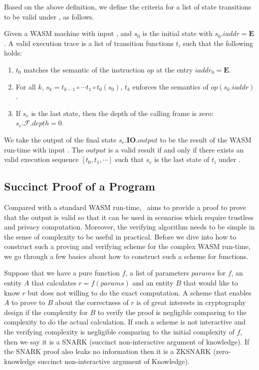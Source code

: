 \smallskip Based on the above definition, we define the criteria for a list of state transitions to be valid under \initstate, as follows.

\begin{definition}
\label{def:valid-trace}
Given a WASM machine with input \initstate, and $s_0$ is the initial state with $s_0.iaddr = \mathbf{E}$. A valid execution trace is a list of transition functions $t_i$ such that the following holds:
\begin{enumerate}[leftmargin=*]
\item $t_0$ matches the semantic of the instruction $op$ at the entry $iaddr_0 = \mathbf{E}$.
\item For all $k$, $s_k = t_{k-1} \circ \cdots t_1 \circ t_0 (s_0)$, $t_k$ enforces the semantics of $op(s_k.iaddr)$.
\item If $s_{e}$ is the last state, then the depth of the calling frame is zero: $s_e.\mathcal{F}.depth = 0$.
\end{enumerate}
\end{definition}

We take the output of the final state $s_e.\mathbf{IO}.output$ to be the result of the WASM run-time with input \initstate. The $output$ is a valid result if and only if there exists an valid execution sequence $\left[t_0, t_1, \cdots \right]$ such that $s_e$ is the last state of $t_i$ under \initstate.

 
\subsection{Succinct Proof of a Program}

Compared with a standard WASM run-time, \zkwasm\, aims to provide a proof to prove that the output is valid so that it can be used in scenarios which require trustless and privacy computation.  Moreover, the verifying algorithm needs to be simple in the sense of complexity to be useful in practical. Before we dive into how to construct such a proving and verifying scheme for the complex WASM run-time, we go through a few basics about how to construct such a scheme for functions.

Suppose that we have a pure function $f$, a list of parameters $params$ for $f$, an entity $A$ that calculates $r = f(params)$ and an entity $B$ that would like to know $r$ but does not willing to do the exact computation. A scheme that enables $A$ to prove to $B$ about the correctness of $r$ is of great interests in cryptography design if the complexity for $B$ to verify the proof is negligible comparing to the complexity to do the actual calculation. If such a scheme is not interactive and the verifying complexity is negligible comparing to the initial complexity of $f$, then we say it is a SNARK (succinct non-interactive argument of knowledge). If the SNARK proof also leaks no information then it is a ZKSNARK (zero-knowledge succinct non-interactive argument of Knowledge).


